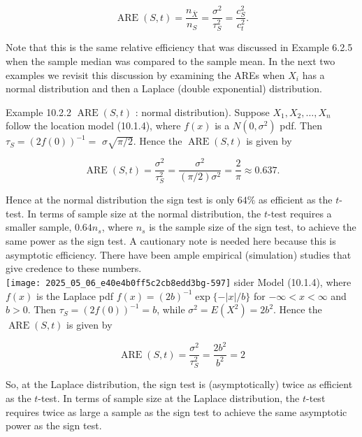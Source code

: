 \begin{equation*}
\operatorname{ARE}(S, t)=\frac{n_{\bar{X}}}{n_{S}}=\frac{\sigma^{2}}{\tau_{S}^{2}}=\frac{c_{S}^{2}}{c_{t}^{2}} . \tag{10.2.27}
\end{equation*}


Note that this is the same relative efficiency that was discussed in Example 6.2.5 when the sample median was compared to the sample mean. In the next two examples we revisit this discussion by examining the AREs when $X_{i}$ has a normal distribution and then a Laplace (double exponential) distribution.

Example 10.2.2 $\operatorname{ARE}(S, t)$ : normal distribution). Suppose $X_{1}, X_{2}, \ldots, X_{n}$ follow the location model (10.1.4), where $f(x)$ is a $N\left(0, \sigma^{2}\right)$ pdf. Then $\tau_{S}=(2 f(0))^{-1}=$ $\sigma \sqrt{\pi / 2}$. Hence the $\operatorname{ARE}(S, t)$ is given by


\begin{equation*}
\operatorname{ARE}(S, t)=\frac{\sigma^{2}}{\tau_{S}^{2}}=\frac{\sigma^{2}}{(\pi / 2) \sigma^{2}}=\frac{2}{\pi} \approx 0.637 . \tag{10.2.28}
\end{equation*}


Hence at the normal distribution the sign test is only $64 \%$ as efficient as the $t$-test. In terms of sample size at the normal distribution, the $t$-test requires a smaller sample, $0.64 n_{s}$, where $n_{s}$ is the sample size of the sign test, to achieve the same power as the sign test. A cautionary note is needed here because this is asymptotic efficiency. There have been ample empirical (simulation) studies that give credence to these numbers.\\
\texttt{[image: 2025\_05\_06\_e40e4b0ff5c2cb8edd3bg-597]} sider Model (10.1.4), where $f(x)$ is the Laplace pdf $f(x)=(2 b)^{-1} \exp \{-|x| / b\}$ for $-\infty<x<\infty$ and $b>0$. Then $\tau_{S}=(2 f(0))^{-1}=b$, while $\sigma^{2}=E\left(X^{2}\right)=2 b^{2}$. Hence the $\operatorname{ARE}(S, t)$ is given by


\begin{equation*}
\operatorname{ARE}(S, t)=\frac{\sigma^{2}}{\tau_{S}^{2}}=\frac{2 b^{2}}{b^{2}}=2 \tag{10.2.29}
\end{equation*}


So, at the Laplace distribution, the sign test is (asymptotically) twice as efficient as the $t$-test. In terms of sample size at the Laplace distribution, the $t$-test requires twice as large a sample as the sign test to achieve the same asymptotic power as the sign test.

